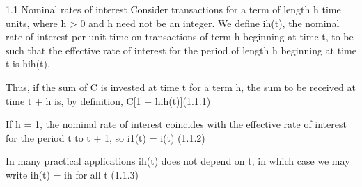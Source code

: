 1.1 Nominal rates of interest
Consider transactions for a term of length h time units, where h > 0 and h need not be an integer. We define ih(t), the nominal rate of interest per unit time on transactions of term h
beginning at time t, to be such that the effective rate of interest for the period of length h beginning at time t is hih(t).
 
Thus, if the sum of C is invested at time t for a term h, the sum to be received at time t + h is, by definition,
C[1 + hih(t)](1.1.1)


If h = 1, the nominal rate of interest coincides with the effective rate of interest for the period t to t + 1, so
i1(t) = i(t) (1.1.2)
 
In many practical applications ih(t) does not depend on t, in which case we may write
ih(t) = ih for all t (1.1.3)
